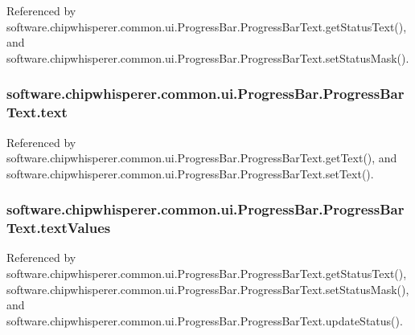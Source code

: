Referenced by software.\+chipwhisperer.\+common.\+ui.\+Progress\+Bar.\+Progress\+Bar\+Text.\+get\+Status\+Text(), and software.\+chipwhisperer.\+common.\+ui.\+Progress\+Bar.\+Progress\+Bar\+Text.\+set\+Status\+Mask().

\hypertarget{classsoftware_1_1chipwhisperer_1_1common_1_1ui_1_1ProgressBar_1_1ProgressBarText_a84ed0b07cd0f4f82c0abe0c0b6666dd0}{}
\subsubsection[{text}]{\setlength{\rightskip}{0pt plus 5cm}software.\+chipwhisperer.\+common.\+ui.\+Progress\+Bar.\+Progress\+Bar\+Text.\+text}\label{classsoftware_1_1chipwhisperer_1_1common_1_1ui_1_1ProgressBar_1_1ProgressBarText_a84ed0b07cd0f4f82c0abe0c0b6666dd0}


Referenced by software.\+chipwhisperer.\+common.\+ui.\+Progress\+Bar.\+Progress\+Bar\+Text.\+get\+Text(), and software.\+chipwhisperer.\+common.\+ui.\+Progress\+Bar.\+Progress\+Bar\+Text.\+set\+Text().

\hypertarget{classsoftware_1_1chipwhisperer_1_1common_1_1ui_1_1ProgressBar_1_1ProgressBarText_a8cdd358344a6bb458f5c68bb41c8e99b}{}
\subsubsection[{text\+Values}]{\setlength{\rightskip}{0pt plus 5cm}software.\+chipwhisperer.\+common.\+ui.\+Progress\+Bar.\+Progress\+Bar\+Text.\+text\+Values}\label{classsoftware_1_1chipwhisperer_1_1common_1_1ui_1_1ProgressBar_1_1ProgressBarText_a8cdd358344a6bb458f5c68bb41c8e99b}


Referenced by software.\+chipwhisperer.\+common.\+ui.\+Progress\+Bar.\+Progress\+Bar\+Text.\+get\+Status\+Text(), software.\+chipwhisperer.\+common.\+ui.\+Progress\+Bar.\+Progress\+Bar\+Text.\+set\+Status\+Mask(), and software.\+chipwhisperer.\+common.\+ui.\+Progress\+Bar.\+Progress\+Bar\+Text.\+update\+Status().

